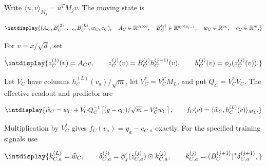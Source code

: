 
Write \(\langle u,\allowbreak v\rangle_{M_j}=u^TM_jv\). The moving state is


\begingroup\renewcommand{\theHequation}{intdisplay.158}
\begin{equation}
\intdisplay{
(A_C,B_C^{(2)},\ldots,B_C^{(L)},w_C,c_C),
\quad A_C\in\mathbb R^{q_1\times d},\quad
B_C^{(j)}\in\mathbb R^{q_j\times q_{j-1}},\quad
w_C\in\mathbb R^{q_L},\quad c_C\in\mathbb R^m.
}
\label{int:eq-0061-harmonic-state}
\end{equation}
\endgroup


For \(v=x/\sqrt d\), set


\begingroup\renewcommand{\theHequation}{intdisplay.159}
\begin{equation*}
\intdisplay{
z_C^{(1)}(v)=A_Cv,\qquad
z_C^{(j)}(v)=B_C^{(j)}h_C^{(j-1)}(v),\qquad
h_C^{(j)}(v)=\phi_j(z_C^{(j)}(v)).
}
\end{equation*}
\endgroup


Let \(V_C\) have columns \(h_C^{(L)}(v_a)/\sqrt m\), let \(V_C^*=V_C^TM_L\), and put \(Q_C=V_C^*V_C\). The effective readout and predictor are


\begingroup\renewcommand{\theHequation}{intdisplay.160}
\begin{equation}
\intdisplay{
\widehat w_C=w_C+V_CQ_C^{-1}
       \left[(y-c_C)/\sqrt m-V_C^*w_C\right],\qquad
f_C(v)=\langle\widehat w_C,h_C^{(L)}(v)\rangle_{M_L}.
}
\label{int:eq-0062-harmonic-corrected-readout}
\end{equation}
\endgroup


Multiplication by \(V_C^*\) gives \(f_C(v_a)=y_a-c_{C,\allowbreak a}\) exactly. For the specified training signals use


\begingroup\renewcommand{\theHequation}{intdisplay.161}
\begin{equation*}
\intdisplay{
k_{C,a}^{(L)}=\widehat w_C,\qquad
\delta_{C,a}^{(j)}=\phi_j'(z_{C,a}^{(j)})\odot k_{C,a}^{(j)},\qquad
k_{C,a}^{(j)}=(B_C^{(j+1)})^*\delta_{C,a}^{(j+1)},
}
\end{equation*}
\endgroup


